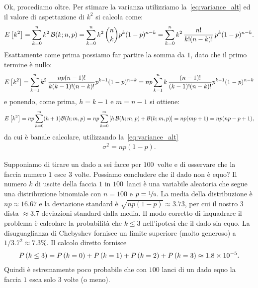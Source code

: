Ok, procediamo oltre.
Per stimare la varianza utilizziamo la~\eqref{eq:variance_alt} ed il valore di
aspettazione di $k^2$ si calcola come:
\begin{align*}
  \expect{k^2} = \sum_{k=0}^n k^2\,\binomialpdf[n, p]{k} =
  \sum_{k=0}^n k^2\,\binom{n}{k} p^k (1 - p)^{n-k} =
  \sum_{k=0}^n k^2\,\binomexpr{n}{k}\,p^k (1 - p)^{n-k}.
\end{align*}
Esattamente come prima possiamo far partire la somma da $1$, dato che
il primo termine è nullo:
\begin{align*}
  \displaystyle E\left[k^2\right] =
  \sum_{k=1}^n k^2\,\frac{np(n -1)!}{k(k - 1)!(n - k)!} p^{k-1} (1 - p)^{n - k} =
  np \sum_{k=1}^n k\,\frac{(n -1)!}{(k - 1)!(n - k)!} p^{k-1} (1 - p)^{n - k}
\end{align*}
e ponendo, come prima, $h = k - 1$ e $m = n - 1$ si ottiene:
\begin{align*}
  \expect{k^2} = np\sum_{h=0}^m (h + 1) \binomialpdf[m, p]{h} =
  np\sum_{h=0}^m \left[h\,\binomialpdf[m, p]{h} + \binomialpdf[m, p]{h}\right] =
  np(mp + 1) = np(np - p +1),
\end{align*}
da cui è banale calcolare, utilizzando la~\eqref{eq:variance_alt}
\begin{align}\label{eq:binomial_variance}
  \sigma^2 = np(1 - p).
\end{align}

\begin{examplebox}
  \begin{example}
    Supponiamo di tirare un dado a sei facce per $100$~volte e di osservare
    che la faccia numero $1$ esce $3$ volte. Possiamo concludere che il dado
    non è equo? Il numero $k$ di uscite della faccia $1$ in $100$~lanci è
    una variabile aleatoria che segue una distribuzione binomiale con $n = 100$
    e $p = \nicefrac{1}{6}$. La media della distribuzione è $np \approx 16.67$
    e la deviazione standard è $\sqrt{np(1 - p)} \approx 3.73$, per cui il
    nostro $3$ dista $\approx 3.7$ deviazioni standard dalla media.
    Il modo corretto di inquadrare il problema è calcolare la probabilità
    che $k \leq 3$ nell'ipotesi che il dado sia equo. La disuguaglianza di
    Chebyshev fornisce un limite superiore (molto generoso) a
    $1/3.7^2 \approx 7.3\%$. Il calcolo diretto fornisce
    \begin{align*}
      \displaystyle P\left(k \leq 3\right) =
      \displaystyle P\left(k = 0\right) + \displaystyle P\left(k = 1\right) + \displaystyle P\left(k = 2\right) + \displaystyle P\left(k = 3\right)
      \approx 1.8 \times 10^{-5}.
    \end{align*}
    Quindi è estremamente poco probabile che con $100$ lanci di un dado equo
    la faccia $1$ esca solo $3$ volte (o meno).
  \end{example}
\end{examplebox}


